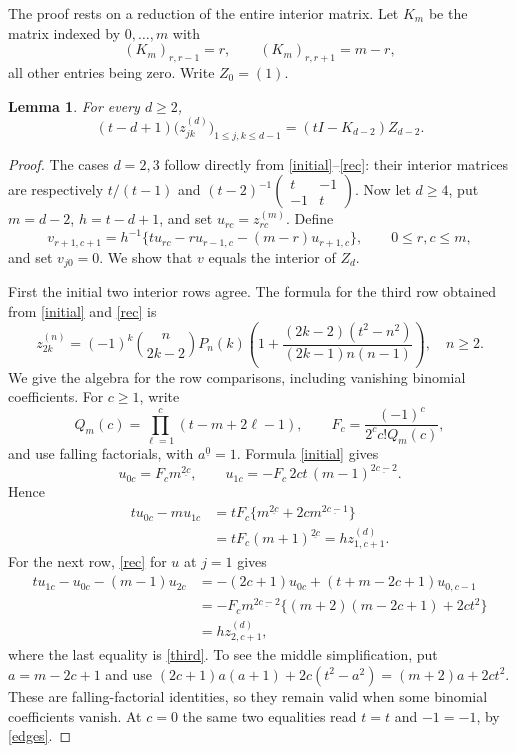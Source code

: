 \documentclass[10pt]{article}
\newtheorem{lemma}{Lemma}
\newcommand{\ff}[2]{#1^{\underline{#2}}}
\begin{document}
The proof rests on a reduction of the entire interior matrix.
Let \(K_m\) be the matrix indexed by \(0,\ldots,m\) with
\[
 (K_m)_{r,r-1}=r,\qquad (K_m)_{r,r+1}=m-r,
\]
all other entries being zero. Write \(Z_0=(1)\).

\begin{lemma}\label{reduction}
For every \(d\ge2\),
\begin{equation}\label{dimension}
 (t-d+1)\bigl(z^{(d)}_{jk}\bigr)_{1\le j,k\le d-1}
       =(tI-K_{d-2})Z_{d-2}.
\end{equation}
\end{lemma}

\begin{proof}
The cases \(d=2,3\) follow directly from \eqref{initial}--\eqref{rec}:
their interior matrices are respectively
\(t/(t-1)\) and
\((t-2)^{-1}\left(\begin{smallmatrix}t&-1\\-1&t\end{smallmatrix}\right)\).
Now let \(d\ge4\), put \(m=d-2\), \(h=t-d+1\), and set
\(u_{rc}=z^{(m)}_{rc}\). Define
\begin{equation}\label{vdef}
 v_{r+1,c+1}=h^{-1}\{tu_{rc}-ru_{r-1,c}-(m-r)u_{r+1,c}\},
 \qquad 0\le r,c\le m,
\end{equation}
and set \(v_{j0}=0\). We show that \(v\) equals the interior of \(Z_d\).

First the initial two interior rows agree. The formula for the third
row obtained from \eqref{initial} and \eqref{rec} is
\begin{equation}\label{third}
 z^{(n)}_{2k}=(-1)^k\binom n{2k-2}P_n(k)
 \left(1+\frac{(2k-2)(t^2-n^2)}{(2k-1)n(n-1)}\right),\quad n\ge2.
\end{equation}
We give the algebra for the row comparisons, including vanishing
binomial coefficients. For \(c\ge1\), write
\[
 Q_m(c)=\prod_{\ell=1}^c(t-m+2\ell-1),\qquad
 F_c=\frac{(-1)^c}{2^c c!Q_m(c)},
\]
and use falling factorials, with \(\ff a0=1\). Formula \eqref{initial}
gives
\[
 u_{0c}=F_c\ff m{2c},\qquad
 u_{1c}=-F_c\,2ct\,\ff{(m-1)}{2c-2}.
\]
Hence
\begin{align*}
 tu_{0c}-mu_{1c}
 &=tF_c\{\ff m{2c}+2c\ff m{2c-1}\}\\
 &=tF_c\ff{(m+1)}{2c}
 =h z^{(d)}_{1,c+1}.
\end{align*}
For the next row, \eqref{rec} for \(u\) at \(j=1\) gives
\begin{align*}
 tu_{1c}-u_{0c}-(m-1)u_{2c}
 &=-(2c+1)u_{0c}+(t+m-2c+1)u_{0,c-1}\\
 &=-F_c\ff m{2c-2}\{(m+2)(m-2c+1)+2ct^2\}\\
 &=h z^{(d)}_{2,c+1},
\end{align*}
where the last equality is \eqref{third}. To see the middle
simplification, put \(a=m-2c+1\) and use
\((2c+1)a(a+1)+2c(t^2-a^2)=(m+2)a+2ct^2\).
These are falling-factorial identities, so they remain valid when
some binomial coefficients vanish. At \(c=0\) the same two
equalities read \(t=t\) and \(-1=-1\), by \eqref{edges}.


\end{proof}
\end{document}
